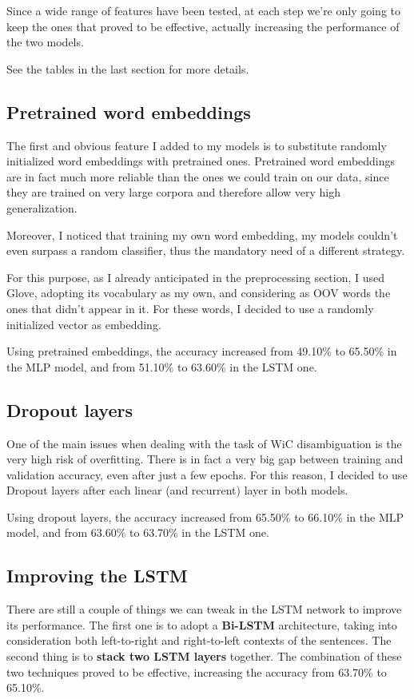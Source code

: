 \documentclass[11pt,a4paper]{article}
\begin{document}
	Since a wide range of features have been tested, at each step we're only going to keep the ones that proved to be effective, actually increasing the performance of the two models.
	
	See the tables in the last section for more details.
	
	\subsection{Pretrained word embeddings}
	The first and obvious feature I added to my models is to substitute randomly initialized word embeddings with pretrained ones. Pretrained word embeddings are in fact much more reliable than the ones we could train on our data, since they are trained on very large corpora and therefore allow very high generalization.
	
	Moreover, I noticed that training my own word embedding, my models couldn't even surpass a random classifier, thus the mandatory need of a different strategy.
	
	For this purpose, as I already anticipated in the preprocessing section, I used Glove, adopting its vocabulary as my own, and considering as OOV words the ones that didn't appear in it. For these words, I decided to use a randomly initialized vector as embedding.
	
	Using pretrained embeddings, the accuracy increased from 49.10\% to 65.50\% in the MLP model, and from 51.10\% to 63.60\% in the LSTM one.
	
	\subsection{Dropout layers}
	One of the main issues when dealing with the task of WiC disambiguation is the very high risk of overfitting. There is in fact a very big gap between training and validation accuracy, even after just a few epochs. For this reason, I decided to use Dropout layers \citep{JMLR:v15:srivastava14a} after each linear (and recurrent) layer in both models.
	
	Using dropout layers, the accuracy increased from 65.50\% to 66.10\% in the MLP model, and from 63.60\% to 63.70\% in the LSTM one.
	
	\subsection{Improving the LSTM}
	There are still a couple of things we can tweak in the LSTM network to improve its performance. The first one is to adopt a \textbf{Bi-LSTM} architecture, taking into consideration both left-to-right and right-to-left contexts of the sentences. The second thing is to \textbf{stack two LSTM layers} together. The combination of these two techniques proved to be effective, increasing the accuracy from 63.70\% to 65.10\%.
	
\end{document}
